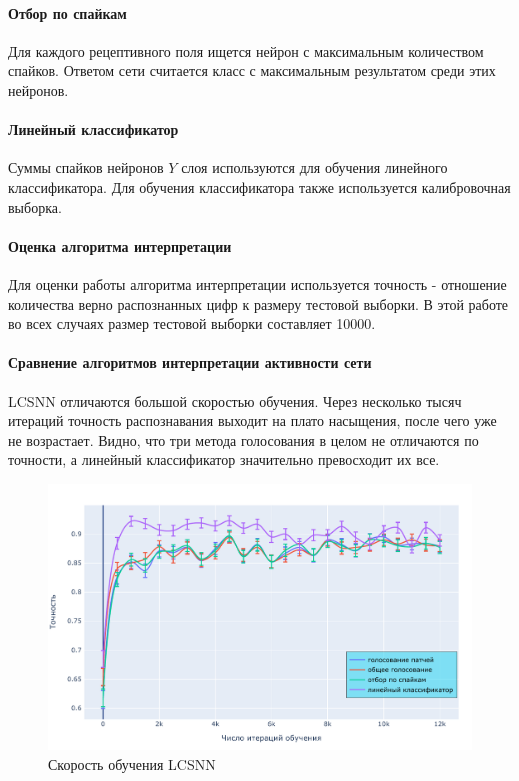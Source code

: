 \documentclass[a4paper]{article}
\begin{document}
\paragraph{Отбор по спайкам}
Для каждого рецептивного поля ищется нейрон с максимальным количеством спайков. Ответом сети считается класс с максимальным результатом среди этих нейронов.

\paragraph{Линейный классификатор}
Суммы спайков нейронов $Y$ слоя используются для обучения линейного классификатора. Для обучения классификатора также используется калибровочная выборка.

\paragraph{Оценка алгоритма интерпретации}
Для оценки работы алгоритма интерпретации используется точность - отношение количества верно распознанных цифр к размеру тестовой выборки. В этой работе во всех случаях размер тестовой выборки составляет 10000. 

\paragraph{Сравнение алгоритмов интерпретации активности сети}
LCSNN отличаются большой скоростью обучения. Через несколько тысяч итераций точность распознавания выходит на плато насыщения, после чего уже не возрастает. Видно, что три метода голосования в целом не отличаются по точности, а линейный классификатор значительно превосходит их все.

\begin{center}
\begin{figure}[H] 
 \includegraphics[width=\textwidth,keepaspectratio=true]{LCSNN_learning_rate_ru.pdf}
 \caption{Скорость обучения LCSNN}
\end{figure}
\end{center}
\end{document}
